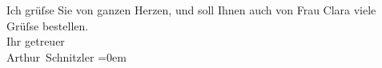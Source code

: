 \pstart
           Ich grüſse Sie von ganzen Herzen, und soll Ihnen auch von Frau Clara viele Grüſse bestellen.{\\[\baselineskip]} Ihr getreuer{\\[\baselineskip]}\spacefill\mbox{Arthur Schnitzler}\pend
           \leftskip=0em{}\endnumbering{}
\begin{anhang}
\end{anhang}\newcommand{\dateiname}{L03983}\newcommand{\titel}{Arthur Schnitzler an Berta Zuckerkandl, 3. 9. 1929}\newcommand{\editorInnen}{Herausgegeben von Jahnke, SelmaMüller, Martin Anton}
